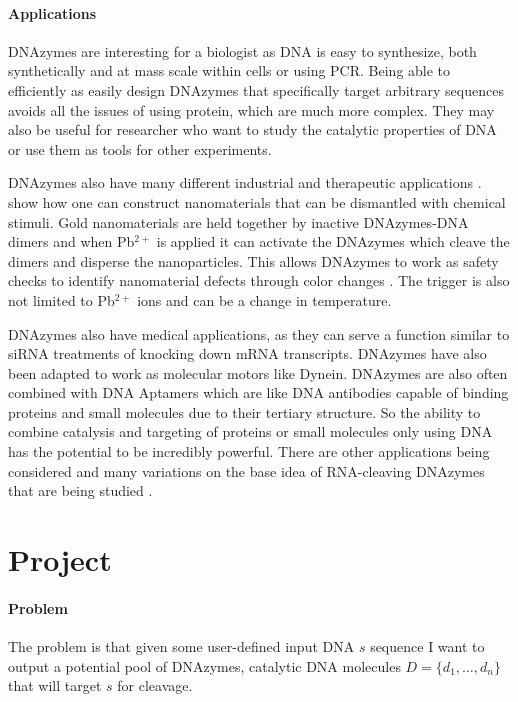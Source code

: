 \documentclass[11pt]{article}
\begin{document}
\paragraph{\textbf{Applications}}
DNAzymes are interesting for a biologist as DNA is easy to synthesize, both synthetically and at mass scale within cells or using PCR.
Being able to efficiently as easily design DNAzymes that specifically target arbitrary sequences avoids all the issues of using protein, which are much more complex.
They may also be useful for researcher who want to study the catalytic properties of DNA or use them as tools for other experiments.
\par
DNAzymes also have many different industrial and therapeutic applications \citep{apps}.
\citeauthor{apps} show how one can construct nanomaterials that can be dismantled with chemical stimuli.
Gold nanomaterials are held together by inactive DNAzymes-DNA dimers and when Pb$^{2+}$ is applied it can activate the DNAzymes which cleave the dimers and disperse the nanoparticles.
This allows DNAzymes to work as safety checks to identify nanomaterial defects through color changes \citep{apps}.
The trigger is also not limited to Pb$^{2+}$ ions and can be a change in temperature.
\par
DNAzymes also have medical applications, as they can serve a function similar to siRNA treatments of knocking down mRNA transcripts.
DNAzymes have also been adapted to work as molecular motors like Dynein.
DNAzymes are also often combined with DNA Aptamers which are like DNA antibodies capable of binding proteins and small molecules due to their tertiary structure.
So the ability to combine catalysis and targeting of proteins or small molecules only using DNA has the potential to be incredibly powerful.
There are other applications being considered and many variations on the base idea of RNA-cleaving DNAzymes that are being studied \cite{apps2}.

\section*{Project}
\paragraph{\textbf{Problem}}
The problem is that given some user-defined input DNA $s$ sequence I want to output a potential pool of DNAzymes, catalytic DNA molecules $D=\{d_1,\ldots,d_n\}$  that will target $s$ for cleavage.
\par
\end{document}

